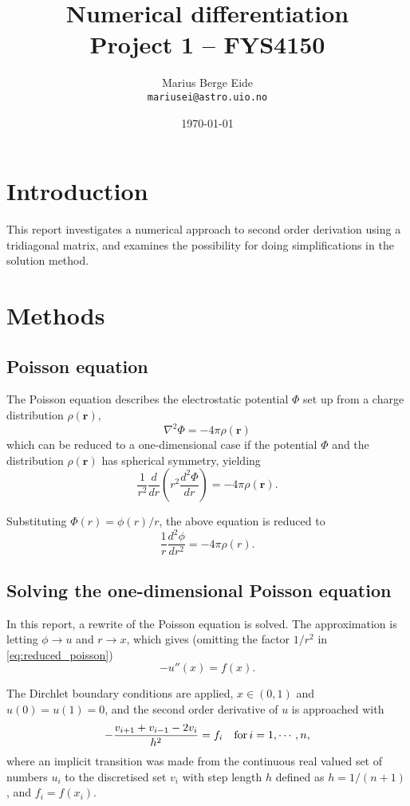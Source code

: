 \documentclass[a4paper,11pt]{article}
\date{\today}
\title{Numerical differentiation\\ \small{Project 1 -- FYS4150}}
\author{Marius Berge Eide \\
\texttt{mariusei@astro.uio.no}}
\begin{document}
\onecolumn
\maketitle{}


\section{Introduction}
    This report investigates a numerical approach to second order derivation using a tridiagonal matrix, and examines the possibility for doing simplifications in the solution method.

\section{Methods}
\subsection{Poisson equation}
    The Poisson equation describes the electrostatic potential $\Phi$ set up from a charge distribution $\rho(\mathbf{r})$, 
    \begin{equation}
        \nabla^2 \Phi = - 4 \pi \rho(\mathbf{r}) 
        \label{eq:poisson}
    \end{equation}
    which can be reduced to a one-dimensional case if the potential $\Phi$ and the distribution $\rho(\mathbf{r})$ has spherical symmetry, yielding
    \[
        \frac{1}{r^2} \frac{d}{dr} \left( r^2 \frac{d^2 \Phi}{dr} \right)
         = - 4 \pi \rho(\mathbf{r}).
    \]

    Substituting $\Phi(r) = \phi(r)/r$, the above equation is reduced to
    \begin{equation}
        \frac{1}{r} \frac{d^2 \phi}{dr^2} = - 4 \pi \rho(r).
        \label{eq:reduced_poisson}
    \end{equation}

\subsection{Solving the one-dimensional Poisson equation}
    In this report, a rewrite of the Poisson equation is solved. The approximation is letting $\phi \rightarrow u$ and $r \rightarrow x$, which gives (omitting the factor $1/r^2$ in \ref{eq:reduced_poisson})
    \[ -u''(x) = f(x). \]

    The Dirchlet boundary conditions are applied, $x \in (0,1)$ and $u(0) = u(1) = 0$, and the second order derivative of $u$ is approached with
    \begin{equation}
    -\frac{v_{i+1} + v_{i-1} - 2v_i}{h^2} = f_i \quad {\rm for}\, i=1,\cdots,n,
        \label{eq:numderiv}
    \end{equation}
    where an implicit transition was made from the continuous real valued set of numbers ${u_i}$ to the discretised set ${v_i}$ with step length $h$ defined as $h = 1/(n+1)$, and $f_i = f(x_i)$.
\end{document}
